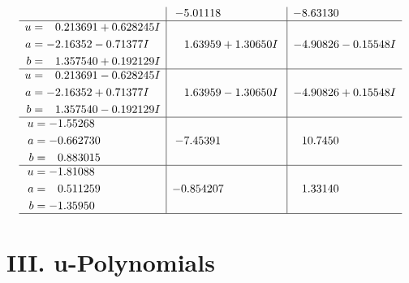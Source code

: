 \documentclass[1p]{elsarticle_modified}
\theoremstyle{definition}
\begin{document}
$$\begin{array}{c|c|c}
 & -5.01118\phantom{ +0.000000I} & -8.63130\phantom{ +0.000000I} \\ \hline\begin{aligned}
u &= \phantom{-}0.213691 + 0.628245 I \\
a &= -2.16352 - 0.71377 I \\
b &= \phantom{-}1.357540 + 0.192129 I\end{aligned}
 & \phantom{-}1.63959 + 1.30650 I & -4.90826 - 0.15548 I \\ \hline\begin{aligned}
u &= \phantom{-}0.213691 - 0.628245 I \\
a &= -2.16352 + 0.71377 I \\
b &= \phantom{-}1.357540 - 0.192129 I\end{aligned}
 & \phantom{-}1.63959 - 1.30650 I & -4.90826 + 0.15548 I \\ \hline\begin{aligned}
u &= -1.55268\phantom{ +0.000000I} \\
a &= -0.662730\phantom{ +0.000000I} \\
b &= \phantom{-}0.883015\phantom{ +0.000000I}\end{aligned}
 & -7.45391\phantom{ +0.000000I} & \phantom{-}10.7450\phantom{ +0.000000I} \\ \hline\begin{aligned}
u &= -1.81088\phantom{ +0.000000I} \\
a &= \phantom{-}0.511259\phantom{ +0.000000I} \\
b &= -1.35950\phantom{ +0.000000I}\end{aligned}
 & -0.854207\phantom{ +0.000000I} & \phantom{-}1.33140\phantom{ +0.000000I}\\
 \hline 
 \end{array}$$\newpage
\newpage\renewcommand{\arraystretch}{1}
\centering \section*{ III. u-Polynomials}
\end{document}
